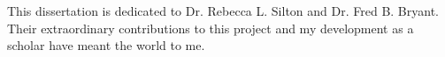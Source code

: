 This dissertation is dedicated to Dr. Rebecca L. Silton and Dr. Fred B. Bryant. Their extraordinary contributions to this project and my development as a scholar have meant the world to me.
